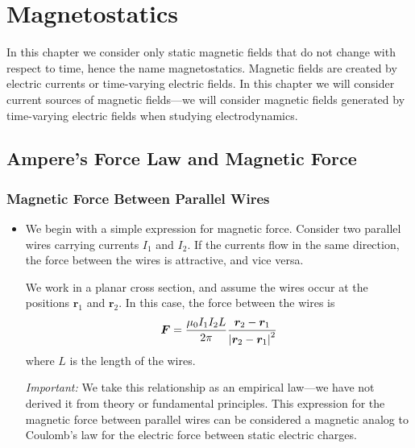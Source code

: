 \documentclass[11pt, a4paper]{article}
\renewcommand{\vec}[1]{\bm{#1}} %
\renewcommand{\r}{\vec{r}}
\newcommand{\mm}{\mu_{0}}  %
\begin{document}
\newpage
\section{Magnetostatics}
In this chapter we consider only static magnetic fields that do not change with respect to time, hence the name magnetostatics. Magnetic fields are created by electric currents or time-varying electric fields. In this chapter we will consider current sources of magnetic fields---we will consider magnetic fields generated by time-varying electric fields when studying electrodynamics.

\subsection{Ampere's Force Law and Magnetic Force}

\subsubsection{Magnetic Force Between Parallel Wires}
\begin{itemize}
	\item We begin with a simple expression for magnetic force. Consider two parallel wires carrying currents $ I_{1} $ and $ I_{2} $. If the currents flow in the same direction, the force between the wires is attractive, and vice versa.
	
	We work in a planar cross section, and assume the wires occur at the positions $ \r_{1} $ and $ \r_{2} $. In this case, the force between the wires is
	\begin{equation*}
        \vec{F} = \frac{\mm I_{1} I_{2} L}{2\pi} \frac{\r_{2}- \r_{1}}{\abs{\r_{2} - \r_{1}}^{2}}
	\end{equation*}
	where $ L $ is the length of the wires. 

    \textit{Important:} We take this relationship as an empirical law---we have not derived it from theory or fundamental principles. This expression for the magnetic force between parallel wires can be considered a magnetic analog to Coulomb's law for the electric force between static electric charges.
	
\end{itemize}
\end{document}
